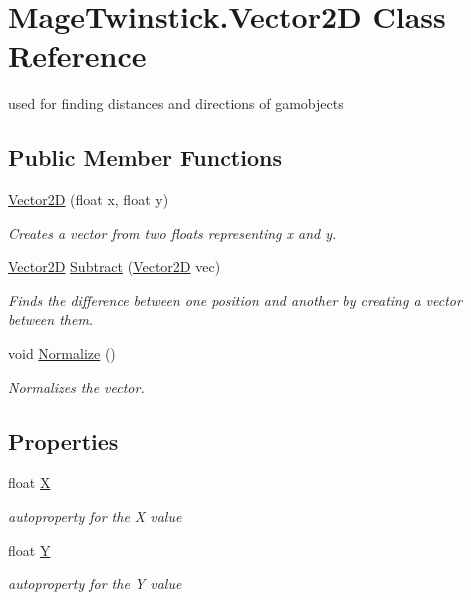 \hypertarget{class_mage_twinstick_1_1_vector2_d}{}\section{Mage\+Twinstick.\+Vector2\+D Class Reference}
\label{class_mage_twinstick_1_1_vector2_d}


used for finding distances and directions of gamobjects  


\subsection*{Public Member Functions}
\begin{DoxyCompactItemize}
\item 
\hyperlink{class_mage_twinstick_1_1_vector2_d_a36be1b509d98d7ff48b7fff196a5bf23}{Vector2\+D} (float x, float y)
\begin{DoxyCompactList}\small\item\em Creates a vector from two floats representing x and y. \end{DoxyCompactList}\item 
\hyperlink{class_mage_twinstick_1_1_vector2_d}{Vector2\+D} \hyperlink{class_mage_twinstick_1_1_vector2_d_a0675eb9cec3cd171d73797698e54f3ba}{Subtract} (\hyperlink{class_mage_twinstick_1_1_vector2_d}{Vector2\+D} vec)
\begin{DoxyCompactList}\small\item\em Finds the difference between one position and another by creating a vector between them. \end{DoxyCompactList}\item 
void \hyperlink{class_mage_twinstick_1_1_vector2_d_a5b24373bc619c7fc5709bba32ca5303c}{Normalize} ()
\begin{DoxyCompactList}\small\item\em Normalizes the vector. \end{DoxyCompactList}\end{DoxyCompactItemize}
\subsection*{Properties}
\begin{DoxyCompactItemize}
\item 
float \hyperlink{class_mage_twinstick_1_1_vector2_d_ac750d49285ebcd4e4bb81295f91ab600}{X}
\begin{DoxyCompactList}\small\item\em autoproperty for the X value \end{DoxyCompactList}\item 
float \hyperlink{class_mage_twinstick_1_1_vector2_d_a0ae54e599156e7c295515bfc80834bfd}{Y}
\begin{DoxyCompactList}\small\item\em autoproperty for the Y value \end{DoxyCompactList}\end{DoxyCompactItemize}


